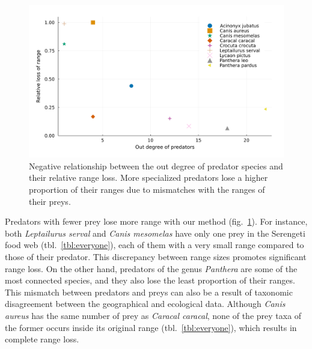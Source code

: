 \documentclass[10pt,oneside]{article}
\makeatletter
\def\maxwidth{\ifdim\Gin@nat@width>\linewidth\linewidth
\else\Gin@nat@width\fi}
\let\Oldincludegraphics\includegraphics
\renewcommand{\includegraphics}[1]{\Oldincludegraphics[width=\maxwidth]{#1}}
\makeatother
\begin{document}
\begin{figure}
\hypertarget{fig:degree}{%
\centering
\includegraphics{figures/rel_loss-outdegree-species.png}
\caption{Negative relationship between the out degree of predator
species and their relative range loss. More specialized predators lose a
higher proportion of their ranges due to mismatches with the ranges of
their preys.}\label{fig:degree}
}
\end{figure}

Predators with fewer prey lose more range with our method
(fig.~\ref{fig:degree}). For instance, both \emph{Leptailurus serval}
and \emph{Canis mesomelas} have only one prey in the Serengeti food web
(tbl.~\ref{tbl:everyone}), each of them with a very small range compared
to those of their predator. This discrepancy between range sizes
promotes significant range loss. On the other hand, predators of the
genus \emph{Panthera} are some of the most connected species, and they
also lose the least proportion of their ranges. This mismatch between
predators and preys can also be a result of taxonomic disagreement
between the geographical and ecological data. Although \emph{Canis
aureus} has the same number of prey as \emph{Caracal caracal}, none of
the prey taxa of the former occurs inside its original range
(tbl.~\ref{tbl:everyone}), which results in complete range loss.
\end{document}
